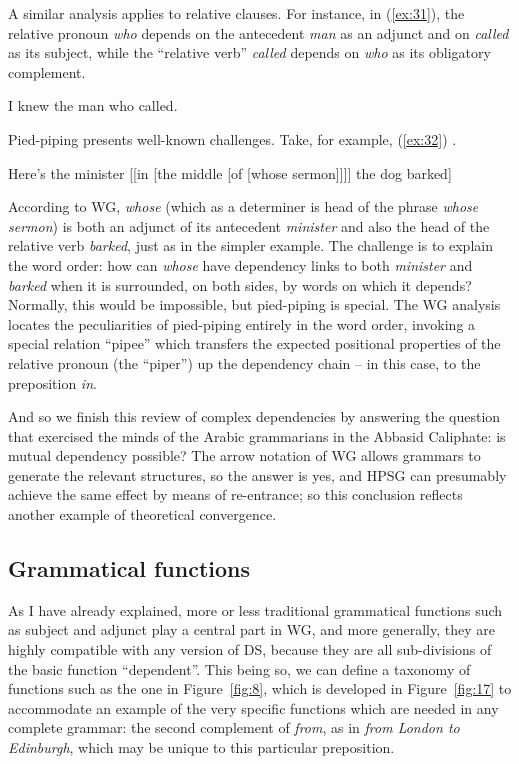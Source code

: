 \documentclass[output=paper
	        ,collection
	        ,collectionchapter
 	        ,biblatex
                ,babelshorthands
                ,newtxmath
                ,draftmode
                ,colorlinks, citecolor=brown
]{langscibook}
\begin{document}
A similar analysis applies to relative clauses. For instance, in (\ref{ex:31}), the relative pronoun \emph{who} depends on the antecedent \emph{man} as an adjunct and on \emph{called} as its subject, while the ``relative verb'' \emph{called} depends on \emph{who} as its obligatory complement.

\begin{exe}
	\ex \label{ex:31} I knew the man who called.
\end{exe}

Pied-piping presents well-known challenges. Take, for example, (\ref{ex:32}) \citep[212]{ps2}.

\begin{exe}
	\ex \label{ex:32} Here’s the minister [[in [the middle [of [whose sermon]]]] the dog barked]
\end{exe}

According to WG, \emph{whose} (which as a determiner is head of the phrase \emph{whose sermon}) is both an adjunct of its antecedent \emph{minister} and also the head of the relative verb \emph{barked}, just as in the simpler example. The challenge is to explain the word order: how can \emph{whose} have dependency links to both \emph{minister} and \emph{barked} when it is surrounded, on both sides, by words on which it depends? Normally, this would be impossible, but pied-piping is special. The WG analysis \citep{Hudson2018a} locates the peculiarities of pied-piping entirely in the word order, invoking a special relation ``pipee'' which transfers the expected positional properties of the relative pronoun (the ``piper'') up the dependency chain – in this case, to the preposition \emph{in}.

And so we finish this review of complex dependencies by answering the question that exercised the minds of the Arabic grammarians in the Abbasid Ca\-liph\-ate: is mutual dependency possible? The arrow notation of WG allows grammars to generate the relevant structures, so the answer is yes, and HPSG can presumably achieve the same effect by means of re-entrance; so this conclusion reflects another example of theoretical convergence.


\subsection{Grammatical functions}
\label{sec:5.3}

As I have already explained, more or less traditional grammatical functions such as subject and adjunct play a central part in WG, and more generally, they are highly compatible with any version of DS, because they are all sub-divisions of the basic function ``dependent''. This being so, we can define a taxonomy of functions such as the one in Figure~\ref{fig:8}, which is developed in Figure~\ref{fig:17} to accommodate an example of the very specific functions which are needed in any complete grammar: the second complement of \emph{from}, as in \emph{from London to Edinburgh}, which may be unique to this particular preposition.
\end{document}
